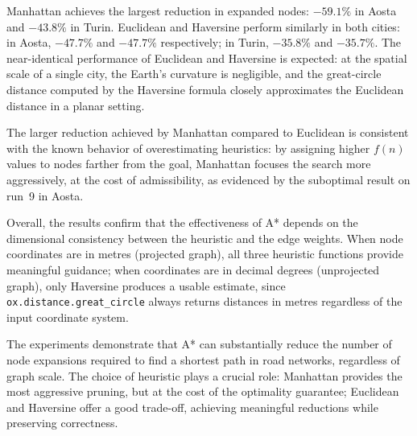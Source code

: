 \documentclass[12pt,a4paper]{article}
\begin{document}
Manhattan achieves the largest reduction in expanded nodes: $-59.1\%$ in Aosta and $-43.8\%$ in Turin.
Euclidean and Haversine perform similarly in both cities: in Aosta, $-47.7\%$ and $-47.7\%$ respectively; in Turin, $-35.8\%$  and $-35.7\%$.
The near-identical performance of Euclidean and Haversine is expected: at the spatial scale of a single city, the Earth's curvature is negligible, and the great-circle distance computed by the Haversine formula closely approximates the Euclidean distance in a planar setting.

The larger reduction achieved by Manhattan compared to Euclidean is consistent with the known behavior of overestimating heuristics: by assigning higher $f(n)$ values to nodes farther from the goal, Manhattan focuses the search more aggressively, at the cost of admissibility, as evidenced by the suboptimal result on run~9 in Aosta.

Overall, the results confirm that the effectiveness of A* depends on the dimensional consistency between the heuristic and the edge weights.
When node coordinates are in metres (projected graph), all three heuristic functions provide meaningful guidance; when coordinates are in decimal degrees (unprojected graph), only Haversine produces a usable estimate, since \texttt{ox.distance.great\_circle} always returns distances in metres regardless of the input coordinate system.

The experiments demonstrate that A* can substantially reduce the number of node expansions required to find a shortest path in road networks, regardless of graph scale.
The choice of heuristic plays a crucial role: Manhattan provides the most aggressive pruning, but at the cost of the optimality guarantee; Euclidean and Haversine offer a good trade-off, achieving meaningful reductions while preserving correctness.

\end{document}
